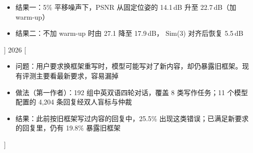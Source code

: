 \documentclass[zh]{resume}
\begin{document}
\begin{experiences}
\begin{itemize}
      \item 结果一：5\% 平移噪声下，PSNR 从固定位姿的 14.1\,dB 升至 22.7\,dB（加 warm-up）
      \item 结果二：不加 warm-up 时由 27.1 降至 17.9\,dB，
        Sim(3) 对齐后恢复 5.5\,dB
    \end{itemize}]
  \separator{0.5ex}
  \experience%
    {2026}%
    { \hfill
     }%
    [\begin{itemize}
      \item 问题：用户要求换框架重写时，模型可能写对了新内容，却仍暴露旧框架。现有评测主要看最新要求，容易漏掉
      \item 做法（第一作者）：192 组中英双语四轮对话，覆盖 8 类写作任务；11 个模型配置的 4,204 条回复经双人盲标与仲裁
      \item 结果：此前按旧框架写过内容的回复中，25.5\% 出现这类错误；已满足新要求的回复里，仍有 19.8\% 暴露旧框架
    \end{itemize}]
\end{experiences}
\end{document}
